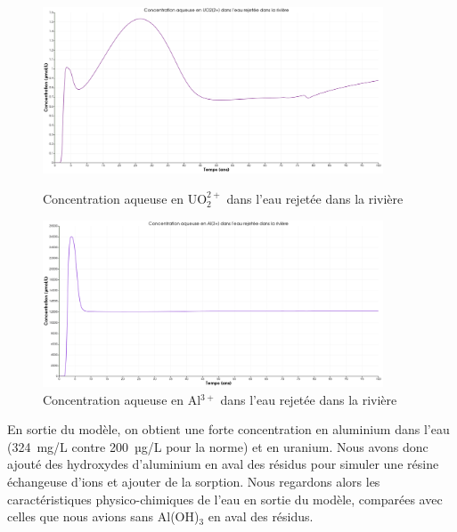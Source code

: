 \documentclass{article}
\begin{document}
\begin{figure}[H]
    \centering
    \begin{minipage}{0.5\textwidth}
        \centering
        \includegraphics[width=0.9\textwidth]{III_B_2_20.png} 
        \caption{Concentration aqueuse en UO$_2^{2+}$ dans l'eau rejetée dans la rivière}
        \label{fig:UO2_riviere_Al}
    \end{minipage}\hfill
    \begin{minipage}{0.5\textwidth}
        \centering
        \includegraphics[width=0.9\textwidth]{III_B_2_21.png} 
        \caption{Concentration aqueuse en Al$^{3+}$ dans l'eau rejetée dans la rivière}
        \label{fig:Al_riviere_Al}
    \end{minipage}
\end{figure}


En sortie du modèle, on obtient une forte concentration en aluminium dans l’eau (324~mg/L contre 200~µg/L pour la norme) et en uranium. Nous avons donc ajouté des hydroxydes d’aluminium en aval des résidus pour simuler une résine échangeuse d’ions et ajouter de la sorption.
Nous regardons alors les caractéristiques physico-chimiques de l’eau en sortie du modèle, comparées avec celles que nous avions sans Al(OH)$_3$ en aval des résidus.
\end{document}
